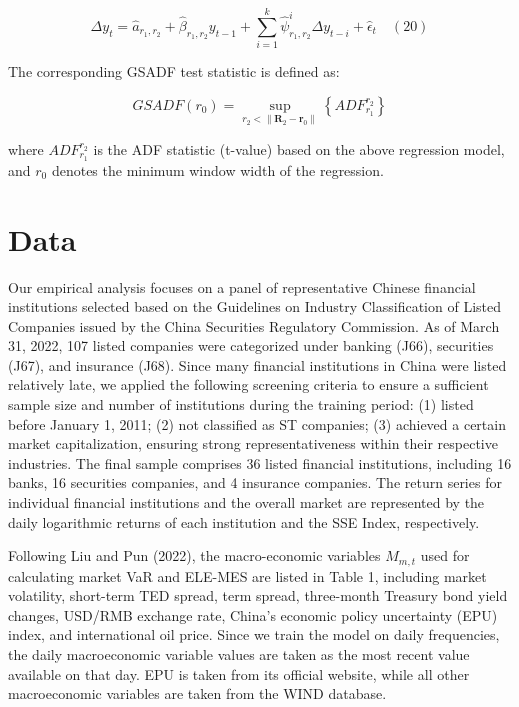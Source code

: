 \documentclass[12pt,a4paper]{article}
\begin{document}
    \[
\Delta y_{t}=\hat{a}_{r_1,r_2}+\hat{\beta}_{r_1,r_2}y_{t-1}+\sum_{i=1}^{k}\hat{\psi}_{r_1,r_2}^{i}\Delta y_{t-i}+\hat{\epsilon}_{t}\quad(20)
\]

    The corresponding GSADF test statistic is defined as:

    \[
    GSADF(r_0) = \underset {r_2< \| \mathbf{R}_2 - \mathbf{r}_0\|}{\sup}\left\{ADF_{r_1}^{r_2}\right\}
    \]

    where $ADF_{r_1}^{r_2}$ is the ADF statistic (t-value) based on the above regression model, and $r_0$ denotes the minimum window width of the regression.

    \section{Data}

    Our empirical analysis focuses on a panel of representative Chinese financial institutions selected based on the Guidelines on Industry Classification of Listed Companies issued by the China Securities Regulatory Commission. As of March 31, 2022, 107 listed companies were categorized under banking (J66), securities (J67), and insurance (J68). Since many financial institutions in China were listed relatively late, we applied the following screening criteria to ensure a sufficient sample size and number of institutions during the training period: (1) listed before January 1, 2011; (2) not classified as ST companies; (3) achieved a certain market capitalization, ensuring strong representativeness within their respective industries. The final sample comprises 36 listed financial institutions, including 16 banks, 16 securities companies, and 4 insurance companies. The return series for individual financial institutions and the overall market are represented by the daily logarithmic returns of each institution and the SSE Index, respectively.

    Following Liu and Pun (2022), the macro-economic variables $M_{m,t}$ used for calculating market VaR and ELE-MES are listed in Table 1, including market volatility, short-term TED spread, term spread, three-month Treasury bond yield changes, USD/RMB exchange rate, China's economic policy uncertainty (EPU) index, and international oil price. Since we train the model on daily frequencies, the daily macroeconomic variable values are taken as the most recent value available on that day. EPU is taken from its official website, while all other macroeconomic variables are taken from the WIND database.
\end{document}
